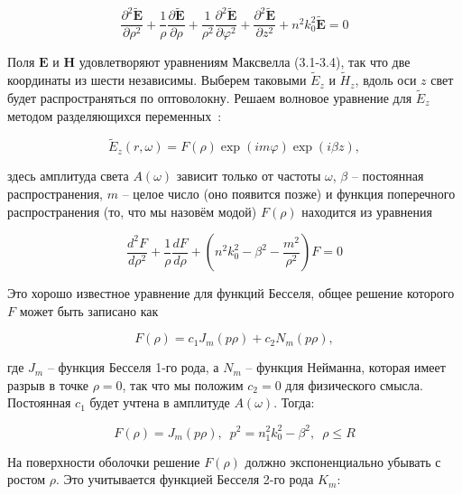 \begin{equation}
	\frac{\partial^2 \widetilde{\mathbf{E}}}{\partial \rho^2} + \frac{1}{\rho} \frac{\partial \widetilde{\mathbf{E}}}{\partial \rho} + \frac{1}{\rho^2} \frac{\partial^2 \widetilde{\mathbf{E}}}{\partial \varphi^2} + \frac{\partial^2 \widetilde{\mathbf{E}}}{\partial z^2} + n^2k_0^2\widetilde{\mathbf{E}} = 0
\end{equation}

Поля $\mathbf{E}$ и $\mathbf{H}$ удовлетворяют уравнениям Максвелла (3.1-3.4), так что две координаты из шести независимы.
Выберем таковыми $\widetilde{E}_z$ и $\widetilde{H}_z$, вдоль оси $z$ свет будет распространяться по оптоволокну.
Решаем волновое уравнение для $\widetilde{E}_z$ методом разделяющихся переменных~\cite{diament1990wave  }:

\begin{equation}
	\widetilde{E}_z(r, \omega) = F(\rho)\exp{(im\varphi)}\exp{(i\beta z)},
\end{equation}

здесь амплитуда света $A(\omega)$ зависит только от частоты $\omega$, $\beta$ -- постоянная распространения, $m$ -- целое число (оно появится позже) и функция поперечного распространения (то, что мы назовём модой) $F(\rho)$ находится из уравнения

\begin{equation}
	\frac{d^2 F}{d \rho^2} + \frac{1}{\rho}\frac{dF}{d\rho} + \left( n^2k_0^2 - \beta^2 - \frac{m^2}{\rho^2} \right)F = 0
\end{equation}

Это хорошо известное уравнение для функций Бесселя, общее решение которого $F$ может быть записано как~\cite{watson1995treatise}

\begin{equation}
	F(\rho) = c_1 J_m(p\rho) + c_2 N_m(p\rho),
\end{equation}

где $J_m$ -- функция Бесселя 1-го рода, а $N_m$ -- функция Нейманна, которая имеет разрыв в точке $\rho=0$, так что мы положим $c_2=0$ для физического смысла. Постоянная $c_1$ будет учтена в амплитуде $A(\omega)$. Тогда:

\begin{equation}
	F(\rho) = J_m(p\rho), \,\,\, p^2 = n_1^2k_0^2-\beta^2, \,\,\, \rho \leq R
\end{equation}

На поверхности оболочки решение $F(\rho)$ должно экспоненциально убывать с ростом $\rho$. Это учитывается функцией Бесселя 2-го рода $K_m$:


